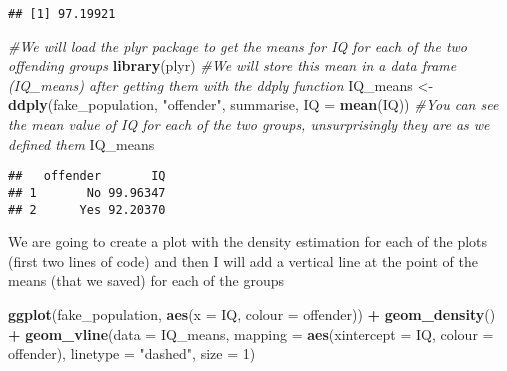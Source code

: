 \documentclass[
]{book}
\newenvironment{Shaded}{\begin{snugshade}}{\end{snugshade}}
\newcommand{\AttributeTok}[1]{\textcolor[rgb]{0.13,0.29,0.53}{#1}}
\newcommand{\CommentTok}[1]{\textcolor[rgb]{0.56,0.35,0.01}{\textit{#1}}}
\newcommand{\DecValTok}[1]{\textcolor[rgb]{0.00,0.00,0.81}{#1}}
\newcommand{\FunctionTok}[1]{\textcolor[rgb]{0.13,0.29,0.53}{\textbf{#1}}}
\newcommand{\NormalTok}[1]{#1}
\newcommand{\OtherTok}[1]{\textcolor[rgb]{0.56,0.35,0.01}{#1}}
\newcommand{\SpecialCharTok}[1]{\textcolor[rgb]{0.81,0.36,0.00}{\textbf{#1}}}
\newcommand{\StringTok}[1]{\textcolor[rgb]{0.31,0.60,0.02}{#1}}
\begin{document}
\begin{Shaded}
\end{Shaded}

\begin{verbatim}
## [1] 97.19921
\end{verbatim}

\begin{Shaded}
\begin{Highlighting}[]
\CommentTok{\#We will load the plyr package to get the means for IQ for each of the two offending groups}
\FunctionTok{library}\NormalTok{(plyr)}
\CommentTok{\#We will store this mean in a data frame (IQ\_means) after getting them with the ddply function}
\NormalTok{IQ\_means }\OtherTok{\textless{}{-}} \FunctionTok{ddply}\NormalTok{(fake\_population, }\StringTok{"offender"}\NormalTok{, summarise, }\AttributeTok{IQ =} \FunctionTok{mean}\NormalTok{(IQ))}
\CommentTok{\#You can see the mean value of IQ for each of the two groups, unsurprisingly they are as we defined them}
\NormalTok{IQ\_means}
\end{Highlighting}
\end{Shaded}

\begin{verbatim}
##   offender       IQ
## 1       No 99.96347
## 2      Yes 92.20370
\end{verbatim}

We are going to create a plot with the density estimation for each of the plots (first two lines of code) and then I will add a vertical line at the point of the means (that we saved) for each of the groups

\begin{Shaded}
\begin{Highlighting}[]
\FunctionTok{ggplot}\NormalTok{(fake\_population, }\FunctionTok{aes}\NormalTok{(}\AttributeTok{x =}\NormalTok{ IQ, }\AttributeTok{colour =}\NormalTok{ offender)) }\SpecialCharTok{+} 
  \FunctionTok{geom\_density}\NormalTok{() }\SpecialCharTok{+}
  \FunctionTok{geom\_vline}\NormalTok{(}\AttributeTok{data =}\NormalTok{ IQ\_means, }\AttributeTok{mapping =} \FunctionTok{aes}\NormalTok{(}\AttributeTok{xintercept =}\NormalTok{ IQ, }\AttributeTok{colour =}\NormalTok{ offender), }\AttributeTok{linetype =} \StringTok{"dashed"}\NormalTok{, }\AttributeTok{size =} \DecValTok{1}\NormalTok{)}
\end{Highlighting}
\end{Shaded}
\end{document}
